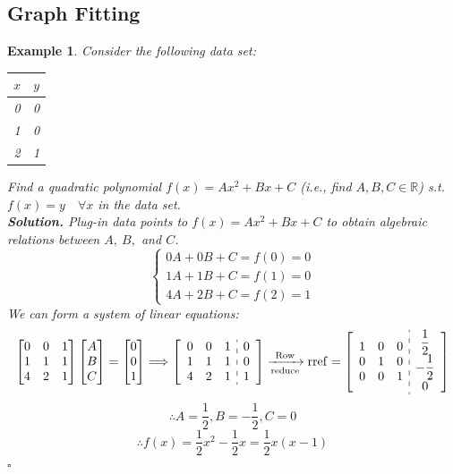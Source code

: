 \documentclass[12pt, a4paper]{article}
\newtheorem{eg}{Example}[subsection]
\newenvironment*{sol}{\indent\textbf{Solution. }}{\hfill{$\square$}\par}
\def\R{{\mathbb{R}}}
\def\C{{\mathbb{C}}}
\def\rref{\mathrm{rref}}
\begin{document}
\subsection{Graph Fitting}
\begin{eg}
	Consider the following data set: \begin{center}\begin{tabular}{c|c}$x$&$y$\\\hline0&0\\1&0\\2&1\end{tabular}\end{center} Find a quadratic polynomial $f(x)=Ax^2+Bx+C$ (i.e., find $A,B,C\in\R$) \emph{s.t.} $f(x)=y\quad\forall x$ in the data set.\\ 
	\begin{sol}
		Plug-in data points to $f(x)=Ax^2+Bx+C$ to obtain algebraic relations between $A,\ B,$ and $C$.
		\[\begin{cases}0A+0B+C=f(0)=0\\1A+1B+C=f(1)=0\\4A+2B+C=f(2)=1\end{cases}\]	
		We can form a system of linear equations: 
		\[\begin{bmatrix}0&0&1\\1&1&1\\4&2&1\end{bmatrix}\begin{bmatrix}A\\B\\C\end{bmatrix}=\begin{bmatrix}0\\0\\1\end{bmatrix}\Longrightarrow\left[\begin{array}{c:c}\begin{matrix}0&0&1\\1&1&1\\4&2&1\end{matrix}&\begin{matrix}0\\0\\1\end{matrix}\end{array}\right]\xrightarrow[\text{reduce}]{\text{Row}}\rref=\left[\begin{array}{c:c}\begin{matrix}1&0&0\\0&1&0\\0&0&1\end{matrix}&\begin{matrix}\dfrac{1}{2}\\-\dfrac{1}{2}\\0\end{matrix}\end{array}\right]\]
		\[\therefore A=\frac{1}{2}, B=-\frac{1}{2}, C=0\]
		\[\therefore f(x)=\frac{1}{2}x^2-\frac{1}{2}x=\frac{1}{2}x(x-1)\]
	\end{sol}
\end{eg}
\end{document}
